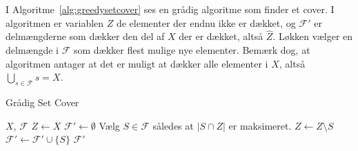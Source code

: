 I Algoritme~\ref{alg:greedysetcover} ses en grådig algoritme som finder et cover. I algoritmen er variablen $Z$ de elementer der endnu ikke er dækket, og $\mathcal{F}'$ er delmængderne som dækker den del af $X$ der er dækket, altså $\hat{Z}$. Løkken vælger en delmængde i $\mathcal{F}$ som dækker flest mulige nye elementer. Bemærk dog, at algoritmen antager at det er muligt at dækker alle elementer i $X$, altså $\bigcup_{s \in \mathcal{F}} s = X$.

\begin{algorithm}
	\caption{\label{alg:greedysetcover}Grådig Set Cover}
	\begin{algorithmic}
		\REQUIRE $X$, $\mathcal{F}$
		\STATE $Z \leftarrow X$
		\STATE $\mathcal{F}' \leftarrow \emptyset$
		\STATE Vælg $S \in \mathcal{F}$ således at $|S \cap Z|$ er maksimeret.
		\STATE $Z \leftarrow Z \setminus S$
		\STATE $\mathcal{F}' \leftarrow \mathcal{F}' \cup \{S\}$
		\ENDWHILE
		\RETURN $\mathcal{F}'$
	\end{algorithmic}
\end{algorithm}

